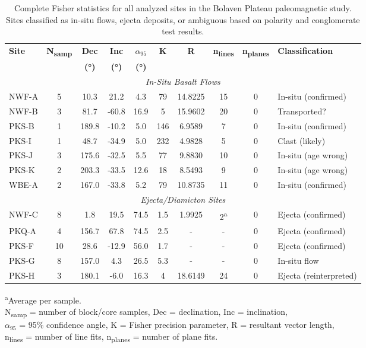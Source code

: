 \begin{table}[htbp]
    \centering
    \caption{Complete Fisher statistics for all analyzed sites in the Bolaven Plateau paleomagnetic study. Sites classified as in-situ flows, ejecta deposits, or ambiguous based on polarity and conglomerate test results.}
    \label{tab:site_statistics}
    \footnotesize
    \begin{tabular}{|l|c|c|c|c|c|c|c|c|l|}
        \hline
        \textbf{Site} & \textbf{N\textsubscript{samp}} & \textbf{Dec} & \textbf{Inc} & \textbf{$\alpha_{95}$} & \textbf{K} & \textbf{R} & \textbf{n\textsubscript{lines}} & \textbf{n\textsubscript{planes}} & \textbf{Classification} \\
        & & \textbf{(°)} & \textbf{(°)} & \textbf{(°)} & & & & & \\
        \hline
        \multicolumn{10}{|c|}{\textit{In-Situ Basalt Flows}} \\
        \hline
        NWF-A & 5 & 10.3 & 21.2 & 4.3 & 79 & 14.8225 & 15 & 0 & In-situ (confirmed) \\
        NWF-B & 3 & 81.7 & -60.8 & 16.9 & 5 & 15.9602 & 20 & 0 & Transported? \\
        PKS-B & 1 & 189.8 & -10.2 & 5.0 & 146 & 6.9589 & 7 & 0 & In-situ (confirmed) \\
        PKS-I & 1 & 48.7 & -34.9 & 5.0 & 232 & 4.9828 & 5 & 0 & Clast (likely) \\
        PKS-J & 3 & 175.6 & -32.5 & 5.5 & 77 & 9.8830 & 10 & 0 & In-situ (age wrong) \\
        PKS-K & 2 & 203.3 & -33.5 & 12.6 & 18 & 8.5493 & 9 & 0 & In-situ (age wrong) \\
        WBE-A & 2 & 167.0 & -33.8 & 5.2 & 79 & 10.8735 & 11 & 0 & In-situ (confirmed) \\
        \hline
        \multicolumn{10}{|c|}{\textit{Ejecta/Diamicton Sites}} \\
        \hline
        NWF-C & 8 & 1.8 & 19.5 & 74.5 & 1.5 & 1.9925 & 2\textsuperscript{a} & 0 & Ejecta (confirmed) \\
        PKQ-A & 4 & 156.7 & 67.8 & 74.5 & 2.5 & - & - & 0 & Ejecta (confirmed) \\
        PKS-F & 10 & 28.6 & -12.9 & 56.0 & 1.7 & - & - & 0 & Ejecta (confirmed) \\
        PKS-G & 8 & 157.0 & 4.3 & 26.5 & 5.3 & - & - & 0 & In-situ flow \\
        PKS-H & 3 & 180.1 & -6.0 & 16.3 & 4 & 18.6149 & 24 & 0 & Ejecta (reinterpreted) \\
        \hline
    \end{tabular}
    
    \vspace{0.5em}
    \raggedright
    \footnotesize
    \textsuperscript{a}Average per sample.\\
    N\textsubscript{samp} = number of block/core samples, Dec = declination, Inc = inclination,\\
    $\alpha_{95}$ = 95\% confidence angle, K = Fisher precision parameter, R = resultant vector length,\\
    n\textsubscript{lines} = number of line fits, n\textsubscript{planes} = number of plane fits.
\end{table}

